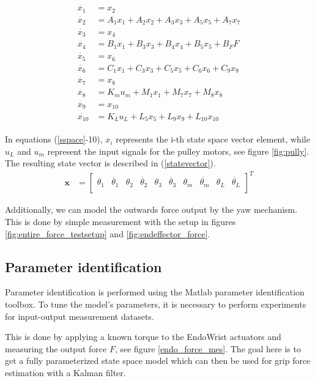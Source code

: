 \begin{gather}\label{sspace}
\begin{align}
\dot{x_1} &= x_2\\
\dot{x_2} &= A_1x_1 + A_2x_2 + A_3x_3 + A_5x_5 + A_7x_7\\
\dot{x_3} &= x_4\\
\dot{x_4} &= B_1x_1 + B_3x_3 + B_4x_4 + B_5x_5 + B_FF\\
\dot{x_5} &= x_6\\
\dot{x_6} &= C_1x_1 + C_3x_3 + C_5x_5 + C_6x_6 + C_9x_9\\
\dot{x_7} &= x_8\\
\dot{x_8} &= K_mu_m + M_1x_1 + M_7x_7 + M_8x_8\\
\dot{x_9} &= x_{10}\\
\dot{x_{10}} &= K_Lu_L + L_5x_5 + L_9x_9 + L_{10}x_{10}
\end{align}
\end{gather}


In equations (\ref{sspace}-10), $x_i$ represents the i-th state space vector element, while $u_L$ and $u_m$ represent the input signals for the pulley motors, see figure \ref{fig:pully}.
The resulting state vector is described in (\ref{statevector}).
\begin{align} \label{statevector}
\mathbf{x} &=
\begin{bmatrix}
\theta_1 &\dot{\theta_1} &\theta_2 &\dot{\theta_2} &\theta_3 &\dot{\theta_3} &\theta_m &\dot{\theta_m} &\theta_L &\dot{\theta_L} \\
\end{bmatrix}^T
\end{align}


Additionally, we can model the outwards force output by the yaw mechanism.
This is done by simple measurement with the setup in figures \ref{fig:entire_force_testsetup} and \ref{fig:endeffector_force}.








\subsection{Parameter identification}
Parameter identification is performed using the Matlab parameter identification toolbox.
To tune the model’s parameters, it is necessary to perform experiments for input-output measurement datasets.


This is done by applying a known torque to the EndoWrist actuators and measuring the output force $F$, see figure \ref{endo_force_mes}.
The goal here is to get a fully parameterized state space model which can then be used for grip force estimation with a Kalman filter.

